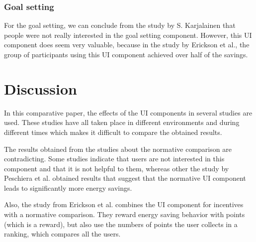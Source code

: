 \documentclass[journal]{vgtc}                %
\begin{document}

\subsubsection{Goal setting}
For the goal setting, we can conclude from the study by S. Karjalainen that people were not really interested in the goal setting component. However, this UI component does seem very valuable, because in the study by Erickson et al., the group of participants using this UI component achieved over half of the savings.


\section{Discussion}
In this comparative paper, the effects of the UI components in several studies are used. These studies have all taken place in different environments and during different times which makes it difficult to compare the obtained results.

The results obtained from the studies about the normative comparison are contradicting. Some studies indicate that users are not interested in this component and that it is not helpful to them, whereas other the study by Peschiera et al. obtained results that suggest that the normative UI component leads to significantly more energy savings.

Also, the study from Erickson et al. combines the UI component for incentives with a normative comparison. They reward energy saving behavior with points (which is a reward), but also use the numbers of points the user collects in a ranking, which compares all the users.\\

\end{document}
